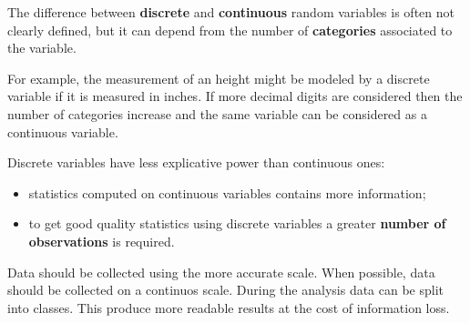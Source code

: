 \begin{frame}
  The difference between \textbf{discrete} and \textbf{continuous} random variables is often not clearly defined, but it can depend from the number of \textbf{categories} associated to the variable.\\
  \begin{footnotesize}
    For example, the measurement of an height might be modeled by a discrete variable if it is measured in inches. If more decimal digits are considered then the number of categories increase and the same variable can be considered as a continuous variable.\\
  \end{footnotesize}
  \vspace*{.25cm}
  Discrete variables have less explicative power than continuous ones:\\
 \begin{itemize}
    \vspace*{-.25cm}
    \item statistics computed on continuous variables contains more information;
    \vspace*{-.15cm}
    \item to get good quality statistics using discrete variables a greater \textbf{number of observations} is required.
  \end{itemize}
  \vspace*{-.25cm}
  \begin{footnotesize}
    Data should be collected using the more accurate scale. When possible, data should be collected on a continuos scale. During the analysis data can be split into classes. This produce more readable results at the cost of information loss. \\
  \end{footnotesize}
\end{frame}





